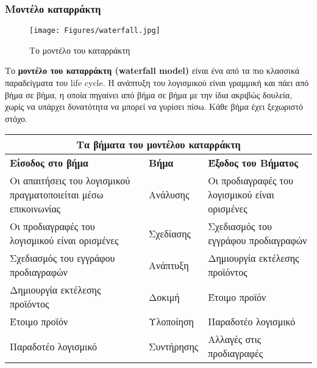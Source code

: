 \subsubsection{Μοντέλο καταρράκτη}

\begin{figure}[th]
    \centering
    \texttt{[image: Figures/waterfall.jpg]}
    \caption[Το μοντέλο του καταρράκτη]{Το μοντέλο του καταρράκτη}
    \label{fig:waterfall}
\end{figure}
Το \textbf{μοντέλο του καταρράκτη (waterfall model)} είναι ένα από τα πιο κλασσικά παραδείγματα του life cycle. Η ανάπτυξη του λογισμικού είναι γραμμική και πάει από βήμα σε βήμα, η οποία πηγαίνει από βήμα σε βήμα με την ίδια ακριβώς δουλεία, χωρίς να υπάρχει δυνατότητα να μπορεί να γυρίσει πίσω. Κάθε βήμα έχει ξεχωριστό στόχο.

\begin{center}
    \begin{tabular}{| p{7cm} | p{2cm} | p{6.5cm} |}
        \hline
        \multicolumn{3}{|c|}{\textbf{Τα βήματα του μοντέλου καταρράκτη}} \\
        \hline
        \textbf{Είσοδος στο βήμα} & \textbf{Βήμα} & \textbf{Έξοδος του Βήματος} \\
        \hline
        Οι απαιτήσεις του λογισμικού πραγματοποιείται μέσω επικοινωνίας & Ανάλυσης &  Οι προδιαγραφές του λογισμικού είναι ορισμένες \\
        \hline
        Οι προδιαγραφές του λογισμικού είναι ορισμένες & Σχεδίασης & Σχεδιασμός του εγγράφου προδιαγραφών \\
        \hline
        Σχεδιασμός του εγγράφου προδιαγραφών & Ανάπτυξη & Δημιουργία εκτέλεσης προϊόντος \\
        \hline
        Δημιουργία εκτέλεσης προϊόντος & Δοκιμή & Έτοιμο προϊόν \\
        \hline
        Έτοιμο προϊόν & Υλοποίηση & Παραδοτέο λογισμικό \\
        \hline
        Παραδοτέο λογισμικό & Συντήρησης & Αλλαγές στις προδιαγραφές \\
        \hline
    \end{tabular}
\end{center}

